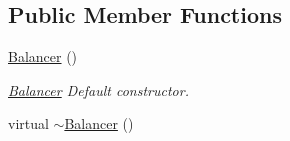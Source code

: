 \subsection*{Public Member Functions}
\begin{DoxyCompactItemize}
\item 
\hyperlink{classow__balancer_1_1Balancer_a4ae19b6176a906425d0b7c23796fac5a}{Balancer} ()\hypertarget{classow__balancer_1_1Balancer_a4ae19b6176a906425d0b7c23796fac5a}{}\label{classow__balancer_1_1Balancer_a4ae19b6176a906425d0b7c23796fac5a}

\begin{DoxyCompactList}\small\item\em \hyperlink{classow__balancer_1_1Balancer}{Balancer} Default constructor. \end{DoxyCompactList}\item 
virtual \hyperlink{classow__balancer_1_1Balancer_a396340c5b302f054af988722d8b7d82d}{$\sim$\+Balancer} ()\hypertarget{classow__balancer_1_1Balancer_a396340c5b302f054af988722d8b7d82d}{}\label{classow__balancer_1_1Balancer_a396340c5b302f054af988722d8b7d82d}


\end{DoxyCompactItemize}
